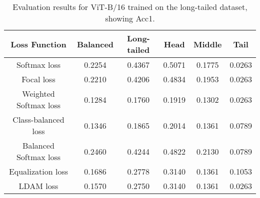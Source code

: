 \begin{table}[H]
    \centering
    \begin{tabular}{cccccc}
        \toprule
        Loss Function & Balanced & Long-tailed & Head & Middle & Tail \\ 
        \midrule
        Softmax loss   & 0.2254 & 0.4367 & 0.5071 & 0.1775 & 0.0263 \\
        Focal loss   & 0.2210 & 0.4206 & 0.4834 & 0.1953 & 0.0263 \\
        Weighted Softmax loss   & 0.1284 & 0.1760 & 0.1919 & 0.1302 & 0.0263 \\
        Class-balanced loss   & 0.1346 & 0.1865 & 0.2014 & 0.1361 & 0.0789 \\
        Balanced Softmax loss   & 0.2460 & 0.4244 & 0.4822 &  0.2130 & 0.0789 \\
        Equalization loss   & 0.1686 & 0.2778 & 0.3140 & 0.1361 & 0.1053 \\
        LDAM loss   & 0.1570 & 0.2750 & 0.3140 & 0.1361 & 0.0263 \\
        \bottomrule
    \end{tabular}
    \caption{Evaluation results for ViT-B/16 trained on the long-tailed dataset, showing Acc1.}
    \label{tab:vil_lt_acc1}
\end{table}


